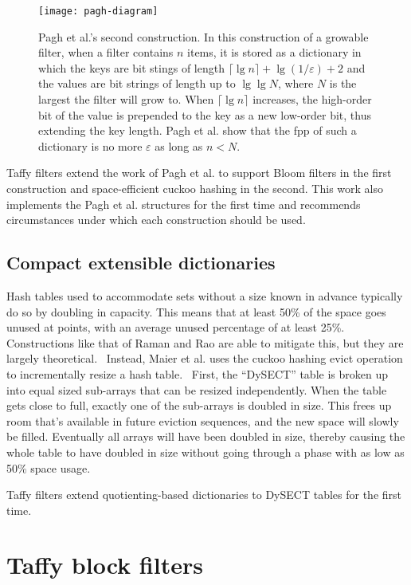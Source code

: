 \documentclass[sigconf, nonacm]{acmart}
\newcommand{\etal}{et al.}
\begin{document}
\begin{figure}
\texttt{[image: pagh-diagram]}
\caption{\label{pagh-diagram}
Pagh \etal{}'s second construction.
In this construction of a growable filter, when a filter contains $n$ items, it is stored as a dictionary in which the keys are bit stings of length $\lceil \lg n \rceil + \lg (1/\varepsilon) + 2$ and the values are bit strings of length up to $\lg \lg N$, where $N$ is the largest the filter will grow to.
When $\lceil \lg n \rceil$ increases, the high-order bit of the value is prepended to the key as a new low-order bit, thus extending the key length.
Pagh \etal{} show that the fpp of such a dictionary is no more $\varepsilon$ as long as $n < N$.
}
\end{figure}

Taffy filters extend the work of Pagh \etal{} to support Bloom filters in the first construction and space-efficient cuckoo hashing in the second.
This work also implements the Pagh \etal{} structures for the first time and recommends circumstances under which each construction should be used.

\subsection{Compact extensible dictionaries}

Hash tables used to accommodate sets without a size known in advance typically do so by doubling in capacity.
This means that at least 50\% of the space goes unused at points, with an average unused percentage of at least 25\%.
Constructions like that of Raman and Rao are able to mitigate this, but they are largely theoretical.~\cite{succinct}
Instead, Maier \etal{} uses the cuckoo hashing evict operation to incrementally resize a hash table.~\cite{dysect}
First, the ``DySECT'' table is broken up into equal sized sub-arrays that can be resized independently.
When the table gets close to full, exactly one of the sub-arrays is doubled in size.
This frees up room that's available in future eviction sequences, and the new space will slowly be filled.
Eventually all arrays will have been doubled in size, thereby causing the whole table to have doubled in size without going through a phase with as low as 50\% space usage.

Taffy filters extend quotienting-based dictionaries to DySECT tables for the first time.

\section{Taffy block filters}
\label{pbf}
\end{document}
